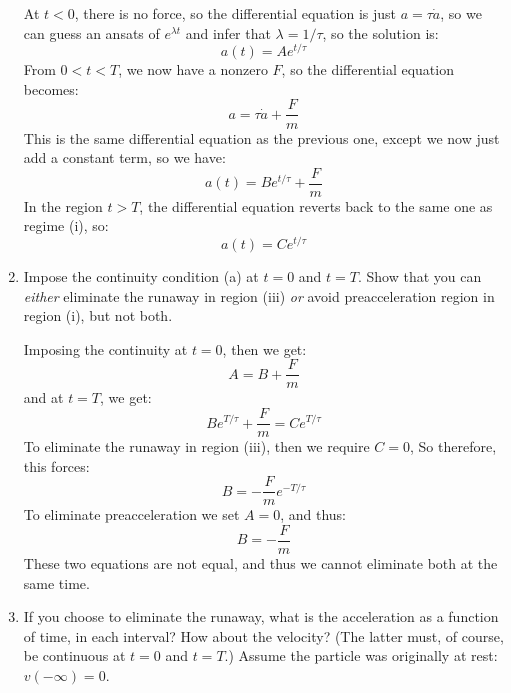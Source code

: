 \documentclass[10pt]{article}
\begin{document}
\begin{enumerate}[label=(\alph*)]
			\begin{solution}
				At \( t < 0 \), there is no force, so the differential equation is just \( a = \tau \dot a
				\), so we can guess an ansats of \( e^{\lambda t} \) and infer that \( \lambda = 1 / \tau \),
				so the solution is:
				\[
					a(t) = A e^{t / \tau}
				\]
				From \( 0 < t < T \), we now have a nonzero \( F \), so the differential equation becomes:
				\[
					a = \tau \dot a + \frac{F}{m}
				\]
				This is the same differential equation as the previous one, except we now just add a constant
				term, so we have:
				\[
					a(t) = B e^{t / \tau} + \frac{F}{m}
				\]
				In the region \( t > T \), the differential equation reverts back to the same one as regime
				(i), so:
				\[
					a(t) = C e^{t / \tau}
				\]
			\end{solution}
		\item Impose the continuity condition (a) at \( t = 0 \) and \( t = T \). Show that you can
			\textit{either} eliminate the runaway in region (iii) \textit{or} avoid preacceleration region in
			region (i), but not both. 

			\begin{solution}
				Imposing the continuity at \( t = 0 \), then we get:
				\[
					A = B + \frac{F}{m}
				\]
				and at \( t = T \), we get:
				\[
					B e^{T / \tau} + \frac{F}{m} = C e^{T / \tau}
				\]
				To eliminate the runaway in region (iii), then we require \( C = 0 \), So therefore, this
				forces:
				\[
					B = -\frac{F}{m}e^{ - T / \tau}
				\]
				To eliminate preacceleration we set \( A = 0 \), and thus:
				\[
					B = -\frac{F}{m}
				\]
				These two equations are not equal, and thus we cannot eliminate both at the same time. 
			\end{solution}
		\item If you choose to eliminate the runaway, what is the acceleration as a function of time, in each
			interval? How about the velocity? (The latter must, of course, be continuous at \( t = 0 \) and \(
			t = T\).) Assume the particle was originally at rest: \( v(-\infty) = 0 \).


\end{enumerate}
\end{document}
